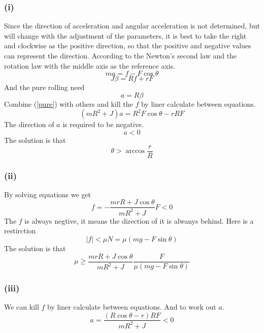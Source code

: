 \documentclass[12pt,a4paper]{article}%
\begin{document}
	\subsubsection*{(i)}
	\noindent Since the direction of acceleration and angular acceleration is not determined, but will change with the adjustment of the parameters, it is best to take the right and clockwise as the positive direction, so that the positive and negative values can represent the direction.
	According to the Newton's second law and the rotation law with the middle axis as the reference axis.
	\begin{equation}
		ma=f-F\cos\theta
	\end{equation}
	\begin{equation}
		J\beta=Rf+rF
	\end{equation}
	And the pure rolling need
	\begin{equation}
		a=R\beta
		\label{pure}
	\end{equation}
	Combine (\ref{pure}) with others and kill the $f$ by liner calculate between equations.
	\begin{equation}
		(mR^2+J)a=R^2F\cos\theta-rRF
	\end{equation}
	The direction of $a$ is required to be negative.
	\begin{equation}
		a<0
	\end{equation}
	The solution is that
	\begin{equation}
		\theta>\arccos\frac{r}{R}
	\end{equation}
	\subsubsection*{(ii)}
	\noindent By solving  equations we get
	\begin{equation}
		f=-\frac{mrR+J\cos \theta}{mR^2+J}F<0
	\end{equation}
	The $f$ is always negtive, it means the direction of it is alwanys behind. Here is a restirction
	\begin{equation}
		|f|<\mu N=\mu(mg-F\sin\theta)
	\end{equation}
	The solution is that
	$$
	\mu \geqslant \frac{mrR+J\cos \theta}{mR^2+J}\frac{F}{\mu \left( mg-F\sin \theta \right)}
	$$
	\subsubsection*{(iii)}
	We can kill $f$ by liner calculate between equations. And to work out $a$.
	$$
	a=\frac{\left( R\cos \theta -r \right) RF}{mR^2+J}<0
	$$
\end{document}
